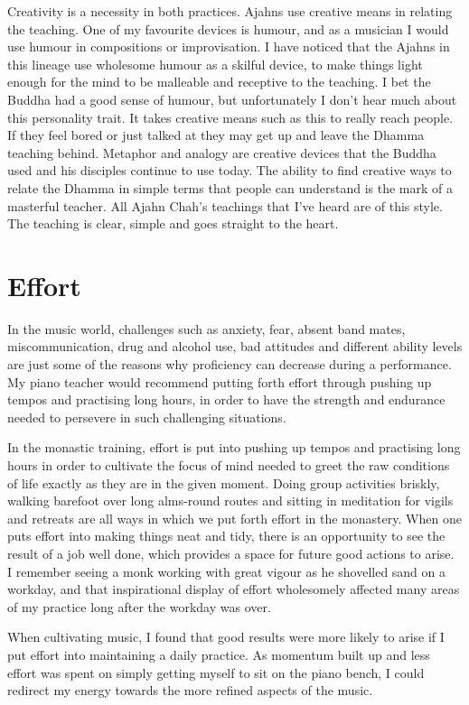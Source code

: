Creativity is a necessity in both practices. Ajahns use creative means
in relating the teaching. One of my favourite devices is humour, and as
a musician I would use humour in compositions or improvisation. I have
noticed that the Ajahns in this lineage use wholesome humour as a
skilful device, to make things light enough for the mind to be malleable
and receptive to the teaching. I bet the Buddha had a good sense of
humour, but unfortunately I don't hear much about this personality
trait. It takes creative means such as this to really reach people. If
they feel bored or just talked at they may get up and leave the Dhamma
teaching behind. Metaphor and analogy are creative devices that the
Buddha used and his disciples continue to use today. The ability to find
creative ways to relate the Dhamma in simple terms that people can
understand is the mark of a masterful teacher. All Ajahn Chah's
teachings that I've heard are of this style. The teaching is clear, 
simple and goes straight to the heart. 

\section{Effort}

In the music world, challenges such as anxiety, fear, absent band mates, 
miscommunication, drug and alcohol use, bad attitudes and different
ability levels are just some of the reasons why proficiency can decrease
during a performance. My piano teacher would recommend putting forth
effort through pushing up tempos and practising long hours, in order to
have the strength and endurance needed to persevere in such challenging
situations. 

In the monastic training, effort is put into pushing up tempos and
practising long hours in order to cultivate the focus of mind needed to
greet the raw conditions of life exactly as they are in the given
moment. Doing group activities briskly, walking barefoot over long
alms-round routes and sitting in meditation for vigils and retreats are
all ways in which we put forth effort in the monastery. When one puts
effort into making things neat and tidy, there is an opportunity to see
the result of a job well done, which provides a space for future good
actions to arise. I remember seeing a monk working with great vigour as
he shovelled sand on a workday, and that inspirational display of effort
wholesomely affected many areas of my practice long after the workday
was over. 

When cultivating music, I found that good results were more likely to
arise if I put effort into maintaining a daily practice. As momentum
built up and less effort was spent on simply getting myself to sit on
the piano bench, I could redirect my energy towards the more refined
aspects of the music.

